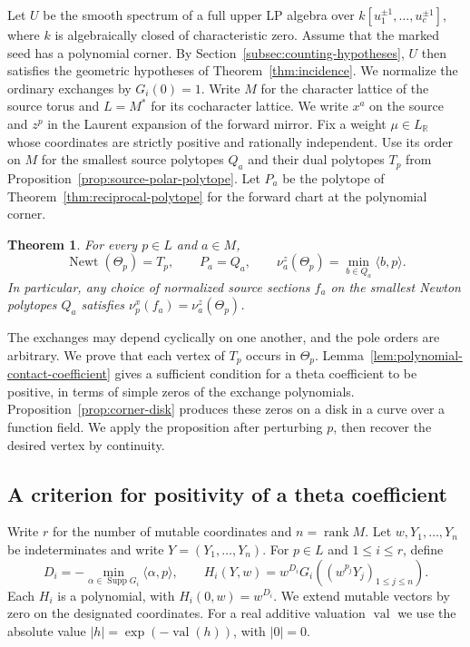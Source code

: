 \documentclass[11pt,reqno]{amsart}
\numberwithin{equation}{section}
\newtheorem{theorem}{Theorem}[section]
\theoremstyle{definition}
\theoremstyle{remark}
\DeclareMathOperator{\Newt}{Newt}
\DeclareMathOperator{\Supp}{Supp}
\begin{document}
Let \(U\) be the smooth spectrum of a full upper LP algebra over
\(k[u_1^{\pm1},\ldots,u_c^{\pm1}]\), where \(k\) is algebraically
closed of characteristic zero. Assume that the marked seed has a
polynomial corner. By Section~\ref{subsec:counting-hypotheses}, \(U\)
then satisfies the geometric hypotheses of Theorem~\ref{thm:incidence}.
We normalize the ordinary exchanges by \(G_i(0)=1\). Write \(M\) for
the character lattice of the source torus and \(L=M^*\) for its
cocharacter lattice. We write \(x^a\) on the source and \(z^p\) in
the Laurent expansion of the forward mirror. Fix a weight \(\mu\in L_{\mathbb R}\)
whose coordinates are strictly positive and rationally independent. Use its
order on \(M\) for the smallest source polytopes \(Q_a\) and their dual
polytopes \(T_p\) from Proposition~\ref{prop:source-polar-polytope}. Let
\(P_a\) be the polytope of Theorem~\ref{thm:reciprocal-polytope} for the
forward chart at the polynomial corner.

\begin{theorem}\label{thm:polynomial-corner-reciprocity}
For every \(p\in L\) and \(a\in M\),
\begin{equation}\label{eq:corner-reciprocity}
\Newt(\Theta_p)=T_p,\qquad P_a=Q_a,\qquad \nu^z_a(\Theta_p)=\min_{b\in Q_a}\langle b,p\rangle .
\end{equation}
In particular, any choice of normalized source sections \(f_a\)
on the smallest Newton polytopes \(Q_a\) satisfies
\(\nu^x_p(f_a)=\nu^z_a(\Theta_p)\).
\end{theorem}

The exchanges may depend cyclically on one another, and the pole orders
are arbitrary. We prove that each vertex of \(T_p\) occurs in
\(\Theta_p\). Lemma~\ref{lem:polynomial-contact-coefficient} gives a
sufficient condition for a theta coefficient to be positive, in terms
of simple zeros of the exchange polynomials. Proposition~\ref{prop:corner-disk}
produces these zeros on a disk in a curve over a function field. We
apply the proposition after perturbing \(p\), then recover the desired
vertex by continuity.

\subsection{A criterion for positivity of a theta coefficient}

Write \(r\) for the number of mutable coordinates and \(n=\operatorname{rank}M\).
Let \(w,Y_1,\ldots,Y_n\) be indeterminates and write \(Y=(Y_1,\ldots,Y_n)\).
For \(p\in L\) and \(1\le i\le r\), define
\[ D_i=-\min_{\alpha\in\Supp G_i}\langle\alpha,p\rangle,\qquad H_i(Y,w)=w^{D_i}G_i((w^{p_j}Y_j)_{1\le j\le n}). \]
Each \(H_i\) is a polynomial, with \(H_i(0,w)=w^{D_i}\).
We extend mutable vectors by zero on the designated coordinates.
For a real additive valuation \(\operatorname{val}\) we use the absolute
value \(|h|=\exp(-\operatorname{val}(h))\), with \(|0|=0\).
\end{document}
